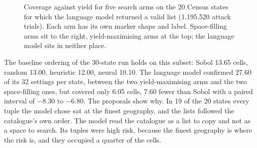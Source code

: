 \begin{figure}[ht]
\centering
{}
\caption{Coverage against yield for five search arms on the 20 Census states for which
the language model returned a valid list (1{,}195{,}520 attack trials). Each arm has its
own marker shape and label. Space-filling arms sit to the right, yield-maximising arms
at the top; the language model sits in neither place.}
\label{c14:fig-llm}
\end{figure}

The baseline ordering of the 30-state run holds on this subset: Sobol 13.65 cells,
random 13.00, heuristic 12.00, neural 10.10. The language model confirmed 27.60 of its
32 settings per state, between the two yield-maximising arms and the two space-filling
ones, but covered only 6.05 cells, 7.60 fewer than Sobol with a paired interval of
$-8.30$ to $-6.80$.
The proposals show why. In 19 of the 20 states every tuple the model chose sat at the
finest geography, and the lists followed the catalogue's own order. The model read the
catalogue as a list to copy and not as a space to search. Its tuples were high risk,
because the finest geography is where the risk is, and they occupied a quarter of the
cells.

